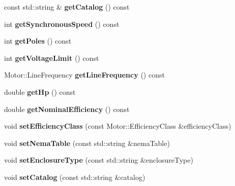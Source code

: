 \begin{DoxyCompactItemize}
\mbox{\label{class_motor_data_a051ccda5450df2ccae18db8087fe04b3}} 
const std\+::string \& {\bfseries get\+Catalog} () const
\item 
\mbox{\label{class_motor_data_acad45303646e735784fd71b62c7cb459}} 
int {\bfseries get\+Synchronous\+Speed} () const
\item 
\mbox{\label{class_motor_data_a478432c15ca29fd1e66b86f9d223248f}} 
int {\bfseries get\+Poles} () const
\item 
\mbox{\label{class_motor_data_a8c9be0561a4e5d18cb1504cc36f5f4ef}} 
int {\bfseries get\+Voltage\+Limit} () const
\item 
\mbox{\label{class_motor_data_a59db7b008daf788c7a6a186dcd49a46f}} 
Motor\+::\+Line\+Frequency {\bfseries get\+Line\+Frequency} () const
\item 
\mbox{\label{class_motor_data_a1a5e37e438f506d11326e70b6fb261b8}} 
double {\bfseries get\+Hp} () const
\item 
\mbox{\label{class_motor_data_a79aed11954e7f104446c43ad29178fa7}} 
double {\bfseries get\+Nominal\+Efficiency} () const
\item 
\mbox{\label{class_motor_data_aeb37e8295eeee82f0c5f9cd04043d7b7}} 
void {\bfseries set\+Efficiency\+Class} (const Motor\+::\+Efficiency\+Class \&efficiency\+Class)
\item 
\mbox{\label{class_motor_data_a51e4f837a2b97baf1aff49efb21ab7ff}} 
void {\bfseries set\+Nema\+Table} (const std\+::string \&nema\+Table)
\item 
\mbox{\label{class_motor_data_a7a6a1b8600a9c7481b32bf962edcef99}} 
void {\bfseries set\+Enclosure\+Type} (const std\+::string \&enclosure\+Type)
\item 
\mbox{\label{class_motor_data_ac7e264252a15a63a2fd35cbb114478e6}} 
void {\bfseries set\+Catalog} (const std\+::string \&catalog)
\item 

\end{DoxyCompactItemize}
